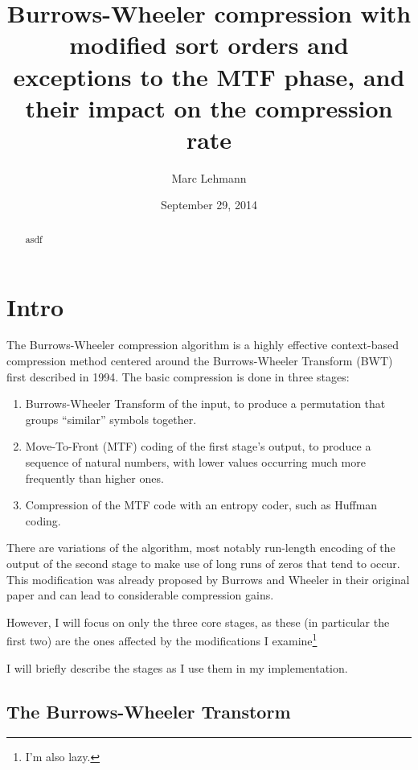 \documentclass[a4paper]{scrreprt}
\title{Burrows-Wheeler compression with modified sort orders and exceptions to
the MTF phase, and their impact on the compression rate}
\date{September 29, 2014}
\author{Marc Lehmann}
\begin{document}
\maketitle

\begin{abstract}
asdf
\end{abstract}
\chapter{Intro}


The Burrows-Wheeler compression algorithm is a highly effective context-based
compression method centered around the Burrows-Wheeler Transform (BWT) first
described in 1994\cite{burrowswheeler1994bwt}.
The basic compression is done in three stages:
\begin{enumerate}
  \item Burrows-Wheeler Transform of the input, to produce a permutation that
  groups ``similar'' symbols together.
  \item Move-To-Front (MTF) coding of the first stage's output, to produce a
  sequence of natural numbers, with lower values occurring much more frequently
  than higher ones.
  \item Compression of the MTF code with an entropy coder, such as Huffman
  coding.
\end{enumerate}
There are variations of the algorithm, most notably run-length encoding of the
output of the second stage to make use of long runs of zeros that tend to occur.
This modification was already proposed by Burrows and Wheeler in their original
paper and can lead to considerable compression gains.

However, I will focus on only the three core stages, as these (in particular
the first two) are the ones affected by the modifications I
examine\footnote{I'm also lazy.}

I will briefly describe the stages as I use them in my implementation.

\section{The Burrows-Wheeler Transtorm}
\end{document}
